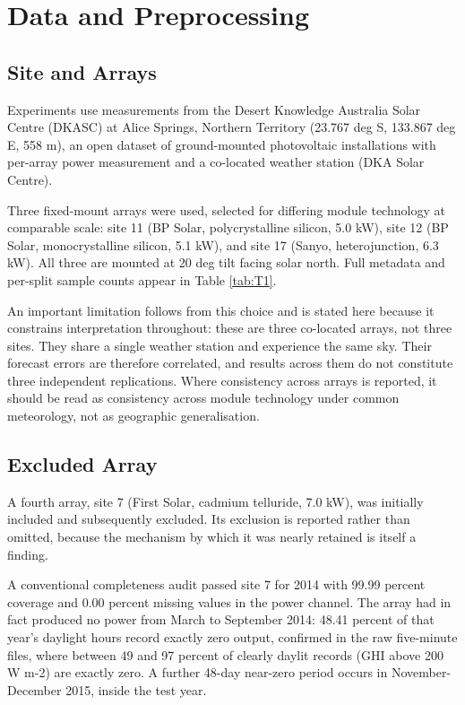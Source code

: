 \section{Data and Preprocessing}

\subsection{Site and Arrays}

Experiments use measurements from the Desert Knowledge Australia Solar
Centre (DKASC) at Alice Springs, Northern Territory (23.767 deg S,
133.867 deg E, 558 m), an open dataset of ground-mounted photovoltaic
installations with per-array power measurement and a co-located weather
station (DKA Solar Centre).

Three fixed-mount arrays were used, selected for differing module
technology at comparable scale: site 11 (BP Solar, polycrystalline
silicon, 5.0 kW), site 12 (BP Solar, monocrystalline silicon, 5.1 kW),
and site 17 (Sanyo, heterojunction, 6.3 kW). All three are mounted at 20
deg tilt facing solar north. Full metadata and per-split sample counts
appear in Table \ref{tab:T1}.



An important limitation follows from this choice and is stated here
because it constrains interpretation throughout: these are three
co-located arrays, not three sites. They share a single weather station
and experience the same sky. Their forecast errors are therefore
correlated, and results across them do not constitute three independent
replications. Where consistency across arrays is reported, it should be
read as consistency across module technology under common meteorology,
not as geographic generalisation.

\subsection{Excluded Array}

A fourth array, site 7 (First Solar, cadmium telluride, 7.0 kW), was
initially included and subsequently excluded. Its exclusion is reported
rather than omitted, because the mechanism by which it was nearly
retained is itself a finding.

A conventional completeness audit passed site 7 for 2014 with 99.99
percent coverage and 0.00 percent missing values in the power channel.
The array had in fact produced no power from March to September 2014:
48.41 percent of that year's daylight hours record exactly zero output,
confirmed in the raw five-minute files, where between 49 and 97 percent
of clearly daylit records (GHI above 200 W m-2) are exactly zero. A
further 48-day near-zero period occurs in November-December 2015, inside
the test year.


